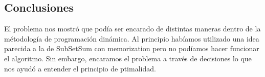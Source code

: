 \subsection{Conclusiones}
El problema nos mostró que podía ser encarado de distintas maneras dentro de la métodología de programación dinámica. Al principio habíamos utilizado una idea parecida a la de SubSetSum con memorization pero no podíamos hacer funcionar el algoritmo. Sin embargo, encaramos el problema a través de decisiones lo que nos ayudó a entender el principio de ptimalidad.
